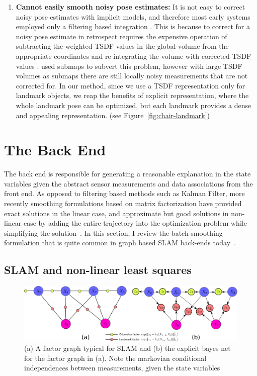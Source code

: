 \begin{enumerate}
    \item \textbf{Cannot easily smooth noisy pose estimates:} It is not easy to correct noisy pose estimates with implicit models, and therefore most early systems employed only a filtering based integration \cite{newcombeKinectFusionRealtimeDense2011}. This is because to correct for a noisy pose estimate in retrospect requires the expensive operation of subtracting the weighted TSDF values in the global volume from the appropriate coordinates and re-integrating the volume with corrected TSDF values \cite{daiBundleFusionRealtimeGlobally2017}. \cite{whelanKintinuousSpatiallyExtended} used submaps to subvert this problem, however with large TSDF volumes as submaps there are still locally noisy measurements that are not corrected for. In our method, since we use a TSDF representation only for landmark objects, we reap the benefits of explicit representation, where the whole landmark pose can be optimized, but each landmark provides a dense and appealing representation. (see Figure~\ref{fig:chair-landmark})
\end{enumerate}

\section{The Back End}

The back end is responsible for generating a reasonable explanation in the state variables given the abstract sensor measurements and data associations from the front end. As opposed to filtering based methods such as Kalman Filter, more recently smoothing formulations based on matrix factorization have provided exact solutions in the linear case, and approximate but good solutions in non-linear case by adding the entire trajectory into the optimization problem while simplifying the solution~\cite{kaessIncrementalSmoothingMapping}. In this section, I review the batch smoothing formulation that is quite common in graph based SLAM back-ends today~\cite{grisettiTutorialGraphBasedSLAM, dellaertFactorGraphsRobot2017}.

\subsection{SLAM and non-linear least squares}

\begin{figure}[htpb]
    \centering
    \includegraphics[width=\linewidth]{figs/factor-graph-background}
    \caption{(a) A factor graph typical for SLAM and (b) the explicit bayes net for the factor graph in (a). Note the markovian conditional independences between measurements, given the state variables}%
    \label{fig:factor-graph}
\end{figure}

